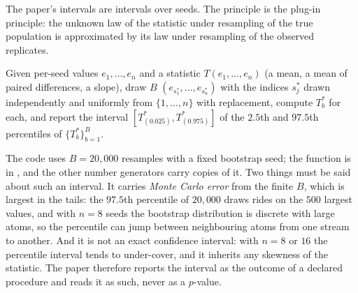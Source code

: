 The paper's intervals are  intervals over seeds. The
principle is the plug-in principle: the unknown law of the statistic under
resampling of the true population is approximated by its law under resampling of the
observed replicates.

\begin{definition}
Given per-seed values $e_1,\dots,e_n$ and a statistic $T(e_1,\dots,e_n)$ (a mean, a
mean of paired differences, a slope), draw $B$ 
$(e_{s_1^*},\dots,e_{s_n^*})$ with the indices $s_j^*$ drawn independently and uniformly
from $\{1,\dots,n\}$ with replacement, compute $T^*_b$ for each, and report the
interval $[T^*_{(0.025)},T^*_{(0.975)}]$ of the $2.5$th and $97.5$th percentiles of
$\{T^*_b\}_{b=1}^B$.
\end{definition}

The code uses $B=20{,}000$ resamples with a fixed bootstrap seed; the function is
 in , and the other number
generators carry copies of it. Two things must be said
about such an interval. It carries \emph{Monte Carlo error} from the finite $B$, which
is largest in the tails: the $97.5$th percentile of $20{,}000$ draws rides on the
$500$ largest values, and with $n=8$ seeds the bootstrap distribution is discrete with
large atoms, so the percentile can jump between neighbouring atoms from one stream
to another. And it is not an exact confidence interval: with $n=8$ or $16$ the
percentile interval tends to under-cover, and it inherits any skewness of the
statistic. The paper therefore reports the interval as the outcome of a declared
procedure and reads it as such, never as a $p$-value.

